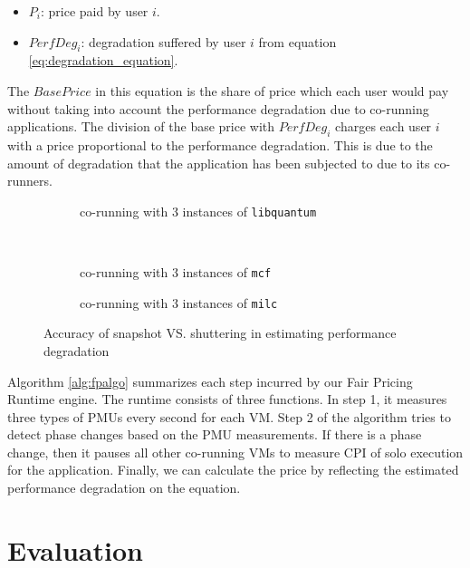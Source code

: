 \documentclass{sig-alternate}
\begin{document}
\begin{itemize}
\item $P_{i}$: price paid by user $i$.
\vspace{-0.08in}
\item $PerfDeg_{i}$: degradation suffered by user $i$ from equation \ref{eq:degradation_equation}.
\end{itemize}


The $BasePrice$ in this equation is the share of price which each user would pay without taking into account the performance degradation due to co-running applications. The division of the base price with $PerfDeg_{i}$ charges each user $i$ with a price proportional to the performance degradation. This is due to the amount of degradation that the application has been subjected to due to its co-runners.
\begin{figure*}
\centering
\begin{subfigure}[t]{2\columnwidth}
\centering
{}
\caption{co-running with 3 instances of \texttt{libquantum}}
\label{fig:accuracylibquantum}
\end{subfigure}
\hfill\\
\begin{subfigure}[t]{2\columnwidth}
\centering
{}
\caption{co-running with 3 instances of \texttt{mcf}}
\label{fig:accuracymcf}
\end{subfigure}
\hfill
\begin{subfigure}[t]{2\columnwidth}
\centering
{}
\caption{co-running with 3 instances of \texttt{milc}}
\label{fig:accuracymilc}
\end{subfigure}
\caption{Accuracy of snapshot VS. shuttering in estimating performance degradation}
\label{fig:Accuracy}
\end{figure*}

Algorithm \ref{alg:fpalgo} summarizes each step incurred by our Fair Pricing Runtime engine. The runtime consists of three functions. In step 1, it measures three types of PMUs every second for each VM. Step 2 of the algorithm tries to detect phase changes based on the PMU measurements. If there is a phase change, then it pauses all other co-running VMs to measure CPI of solo execution for the application. Finally, we can calculate the price by reflecting the estimated performance degradation on the equation.
\section{Evaluation}
\label{sec:Evaluation}
\end{document}
